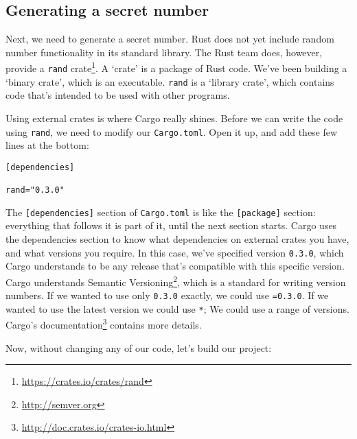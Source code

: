 \documentclass[a4paper,]{book}
\newenvironment{Shaded}{\begin{snugshade}}{\end{snugshade}}
\newcommand{\KeywordTok}[1]{\textcolor[rgb]{0.13,0.29,0.53}{\textbf{{#1}}}}
\newcommand{\NormalTok}[1]{{#1}}
\renewcommand{\href}[2]{#2\footnote{\url{#1}}}
\begin{document}
\subsection{Generating a secret
number}\label{generating-a-secret-number}

Next, we need to generate a secret number. Rust does not yet include
random number functionality in its standard library. The Rust team does,
however, provide a \href{https://crates.io/crates/rand}{\texttt{rand}
crate}. A `crate' is a package of Rust code. We've been building a
`binary crate', which is an executable. \texttt{rand} is a `library
crate', which contains code that's intended to be used with other
programs.

Using external crates is where Cargo really shines. Before we can write
the code using \texttt{rand}, we need to modify our \texttt{Cargo.toml}.
Open it up, and add these few lines at the bottom:

\begin{verbatim}
[dependencies]

rand="0.3.0"
\end{verbatim}

The \texttt{{[}dependencies{]}} section of \texttt{Cargo.toml} is like
the \texttt{{[}package{]}} section: everything that follows it is part
of it, until the next section starts. Cargo uses the dependencies
section to know what dependencies on external crates you have, and what
versions you require. In this case, we've specified version
\texttt{0.3.0}, which Cargo understands to be any release that's
compatible with this specific version. Cargo understands
\href{http://semver.org}{Semantic Versioning}, which is a standard for
writing version numbers. If we wanted to use only \texttt{0.3.0}
exactly, we could use \texttt{=0.3.0}. If we wanted to use the latest
version we could use \texttt{*}; We could use a range of versions.
\href{http://doc.crates.io/crates-io.html}{Cargo's documentation}
contains more details.

Now, without changing any of our code, let's build our project:

\begin{Shaded}
\end{Shaded}
\end{document}
